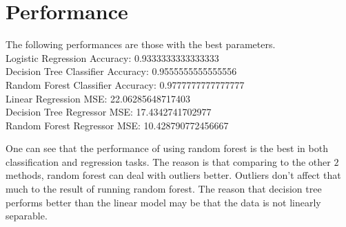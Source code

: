 \section{Performance}

\noindent
The following performances are those with the best parameters.\\
Logistic Regression Accuracy: 0.9333333333333333\\
Decision Tree Classifier Accuracy: 0.9555555555555556\\
Random Forest Classifier Accuracy: 0.9777777777777777\\
Linear Regression MSE: 22.06285648717403\\
Decision Tree Regressor MSE: 17.4342741702977\\
Random Forest Regressor MSE: 10.428790772456667

One can see that the performance of using random forest is the best in both classification and regression tasks. The reason is that comparing to the other $2$ methods, random forest can deal with outliers better. Outliers don't affect that much to the result of running random forest. The reason that decision tree performs better than the linear model may be that the data is not linearly separable.

